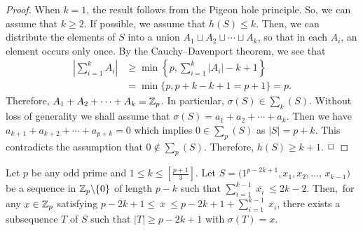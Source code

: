 \documentclass[fleqn]{mat01}
\begin{document}
\begin{proof}
When $k=1$, the result follows from the Pigeon hole principle. So, we
can assume that $k\geq 2$. If possible, we assume that $h(S) \leq k$.
Then, we can distribute the elements of $S$ into a union $A_{1} \sqcup A_{2}
\sqcup \cdots \sqcup A_{k}$, so that in each $A_{i}$, an element occurs only
once. By the Cauchy--Davenport theorem, we see that
\begin{align*}
\left|\sum_{i=1}^{k}A_i\right| &\geq \min\left\{p, \sum_{i=1}^{k}|A_i| -
k+1\right\}\\[.3pc]
&= \min\{p, p+k-k+1 = p+1\} = p.
\end{align*}
Therefore, $A_1+A_2+\cdots+A_{k} = {\Bbb Z}_p$. In particular, $\sigma(S)\in
\sum_{k}(S)$. Without loss of generality we shall assume that $\sigma(S)
= a_1+a_2+\cdots+a_{k}$. Then we have $a_{k+1}+a_{k+2}+\cdots+ a_{p+k} =
0$ which implies $0\in \sum_p(S)$ as $|S| = p+k$. This contradicts the
assumption that $0\not\in \sum_p(S)$. Therefore, $h(S)\geq k+1$.
$\hfill\Box$
\end{proof}


\begin{lem} Let $p$ be any odd prime and $1\leq k\leq \left[ \frac{p+1}3
\right]$. Let $S =(1^{p-2k+1}, x_1, x_2, \ldots${\rm ,} $x_{k-1})$ be a sequence
in ${\Bbb Z}_p\backslash\{0\}$ of length $p-k$ such that
$\sum_{i=1}^{k-1} \ \overline{x_i} \ \leq 2k-2$. Then{\rm ,}\, for any
$x\in {\Bbb Z}_p$ satisfying $p-2k+1\leq \ \overline{x} \ \leq p-2k+1+
\sum_{i=1}^{k-1}\ \overline{x_i}${\rm ,} there exists a subsequence $T$
of $S$ such that $|T| \geq p-2k+1$ with $\sigma(T) = x$.
\end{lem}
\end{document}
